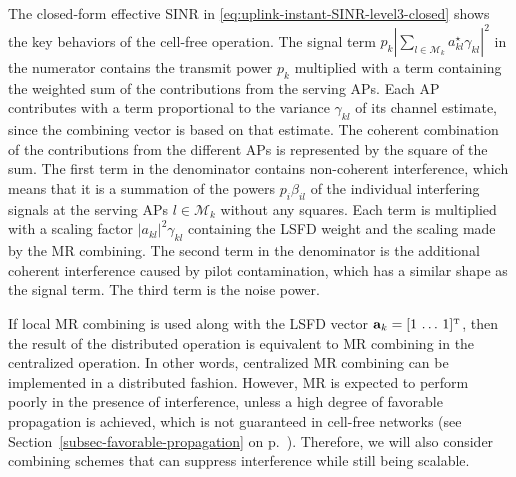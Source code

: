 The closed-form effective SINR in \eqref{eq:uplink-instant-SINR-level3-closed} shows the key behaviors of the cell-free operation. The signal term $p_{k} | 
\sum_{l \in \mathcal{M}_k} a_{kl}^{\star} \gamma_{kl} |^2$ in the numerator contains the transmit power $p_k$ multiplied with a term containing the weighted sum of the contributions from the serving APs. Each AP contributes with a term proportional to the variance $ \gamma_{kl}$ of its channel estimate, since the combining vector is based on that estimate. The coherent combination of the contributions from the different APs is represented by the square of the sum.
 The first term in the denominator contains non-coherent interference, which means that it is a summation of the powers $p_i \beta_{il}$ of the individual interfering signals at the serving APs $l \in \mathcal{M}_k$ without any squares. Each term is multiplied with a scaling factor $|a_{kl}|^2 \gamma_{kl}$ containing the LSFD weight and the scaling made by the MR combining. The second term in the denominator is the additional coherent interference caused by pilot contamination, which has a similar shape as the signal term. The third term is the noise power.

If local MR combining is used along with the LSFD vector $\vect{a}_k = [1 \, \ldots \, 1]^{\Ttran}$, then the result of the distributed operation is equivalent to MR combining in the centralized operation. 
In other words, centralized MR combining can be implemented in a distributed fashion.
However, MR is expected to perform poorly in the presence of interference, unless a high degree of favorable propagation is achieved, which is not guaranteed in cell-free networks (see Section~\ref{subsec-favorable-propagation} on p.~\pageref{subsec-favorable-propagation}). Therefore, we will also consider combining schemes that can suppress interference while still being scalable.


